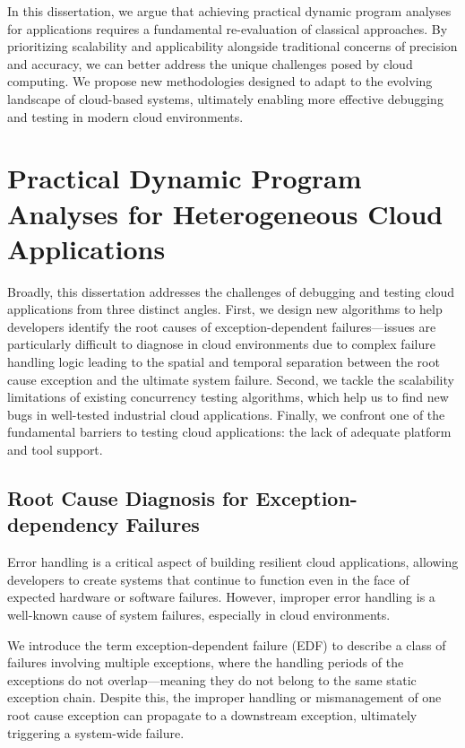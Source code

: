 In this dissertation, we argue that achieving practical dynamic program analyses for applications requires a fundamental re-evaluation of classical approaches. By prioritizing scalability and applicability alongside traditional concerns of precision and accuracy, we can better address the unique challenges posed by cloud computing. We propose new methodologies designed to adapt to the evolving landscape of cloud-based systems, ultimately enabling more effective debugging and testing in modern cloud environments. 


\section{Practical Dynamic Program Analyses for Heterogeneous Cloud Applications}

Broadly, this dissertation addresses the challenges of debugging and testing cloud applications from three distinct angles. First, we design new algorithms to help developers identify the root causes of exception-dependent failures—issues are particularly difficult to diagnose in cloud environments due to complex failure handling logic leading to the spatial and temporal separation between the root cause exception and the ultimate system failure. Second, we tackle the scalability limitations of existing concurrency testing algorithms, which help us to find new bugs in well-tested industrial cloud applications. Finally, we confront one of the fundamental barriers to testing cloud applications: the lack of adequate platform and tool support. 

\subsection{Root Cause Diagnosis for Exception-dependency Failures}

Error handling is a critical aspect of building resilient cloud applications, allowing developers to create systems that continue to function even in the face of expected hardware or software failures. However, improper error handling is a well-known cause of system failures, especially in cloud environments.

We introduce the term exception-dependent failure (EDF) to describe a class of failures involving multiple exceptions, where the handling periods of the exceptions do not overlap---meaning they do not belong to the same static exception chain. Despite this, the improper handling or mismanagement of one root cause exception can propagate to a downstream exception, ultimately triggering a system-wide failure.


